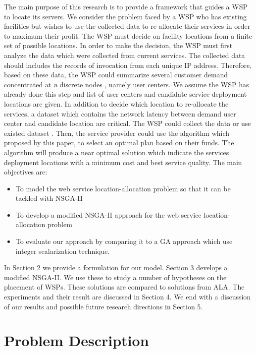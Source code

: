 \documentclass[twoside]{article}
\begin{document}
The main purpose of this research is to provide a framework that guides a WSP to locate its servers.
We consider the problem faced by a WSP who has existing facilities but wishes to use the collected data to re-allocate their services in order to maximum their profit.
The WSP must decide on facility locations from a finite set of possible locations. 
In order to make the decision, the WSP must first analyze the data which were collected from current services. 
The collected data should includes the records of invocation from each unique IP address.
Therefore, based on these data, the WSP could summarize several customer demand concentrated at \textit{n} discrete nodes \cite{Aboolian200964}, namely user centers. 
We assume the WSP has already done this step and list of user centers and candidate service deployment locations are given.
In addition to decide which location to re-allocate the services, a dataset which contains the network latency between demand user center and candidate location are critical. 
The WSP could collect the data or use existed dataset \cite{5552800, 6076756}. 
Then, the service provider could use the algorithm which proposed by this paper, to select an optimal plan based on their funds. 
The algorithm will produce a near optimal solution which indicate the services deployment locations with a minimum cost and best service quality.
The main objectives are:
\begin{itemize}
	\item To model the web service location-allocation problem so that it can be tackled with NSGA-II
	\item To develop a modified NSGA-II approach for the web service location-allocation problem
	\item To evaluate our approach by comparing it to a GA approach which use integer scalarization technique.
\end{itemize}


In Section 2 we provide a formulation for our model. Section 3 develops a modified NSGA-II. 
We use these to study a number of hypotheses on the placement of WSPs. These solutions are compared to solutions from ALA. 
The experiments and their result are discussed in Section 4. We end with a discussion of our results and possible future 
research directions in Section 5.








\section{Problem Description}
\end{document}
